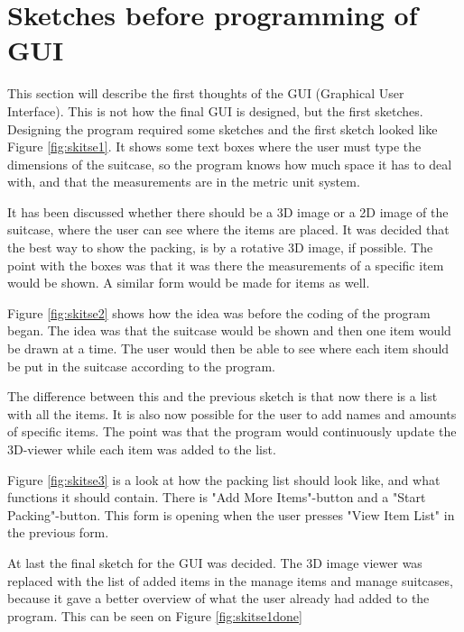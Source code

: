 \section{Sketches before programming of GUI}
\label{sec:sketches}
This section will describe the first thoughts of the GUI (Graphical User Interface). This is not how the final GUI is designed, but the first sketches.
Designing the program required some sketches and the first sketch looked like Figure \ref{fig:skitse1}.
It shows some text boxes where the user must type the dimensions of the suitcase, so the program knows how much space it has to deal with, and that the measurements are in the metric unit system.


It has been discussed whether there should be a 3D image or a 2D image of the suitcase, where the user can see where the items are placed. It was decided that the best way to show the packing, is by a rotative 3D image, if possible.
The point with the boxes was that it was there the measurements of a specific item would be shown.
A similar form would be made for items as well.


Figure \ref{fig:skitse2} shows how the idea was before the coding of the program began. The idea was that the suitcase would be shown and then one item would be drawn at a time. The user would then be able to see where each item should be put in the suitcase according to the program.

The difference between this and the previous sketch is that now there is a list with all the items. It is also now possible for the user to add names and amounts of specific items. The point was that the program would continuously update the 3D-viewer while each item was added to the list.


Figure \ref{fig:skitse3} is a look at how the packing list should look like, and what functions it should contain.
There is "Add More Items"-button and a "Start Packing"-button. This form is opening when the user presses "View Item List" in the previous form.

At last the final sketch for the GUI was decided. The 3D image viewer was replaced with the list of added items in the manage items and manage suitcases, because it gave a better overview of what the user already had added to the program. This can be seen on Figure \ref{fig:skitse1done} 

